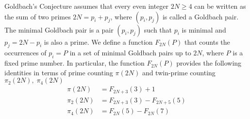 Goldbach's Conjecture assumes that every even integer $2N \geq 4$ can be written as the sum of two primes
$2N = p_i + p_j$, where $(p_i, p_j)$ is called a Goldbach pair.
The minimal Goldbach pair is a pair $(p_i, p_j)$ such that $p_i$ is minimal and $p_j = 2N - p_i$ is also a prime.
We define a function $F_{2N}(P)$ that counts the occurrences of $p_i = P$ in a set of minimal Goldbach pairs
up to $2N$, where $P$ is a fixed prime number.
In particular, the function $F_{2N}(P)$ provides the following identities in terms of prime counting $\pi(2N)$ and
twin-prime counting $\pi_2(2N), \; \pi_4(2N)$
\begin{align*}
    \pi(2N)   &= F_{2N+3}(3) + 1 \\
    \pi_2(2N) &= F_{2N+3}(3) - F_{2N+5}(5) \\
    \pi_4(2N) &= F_{2N}(5) - F_{2N}(7)
\end{align*}

